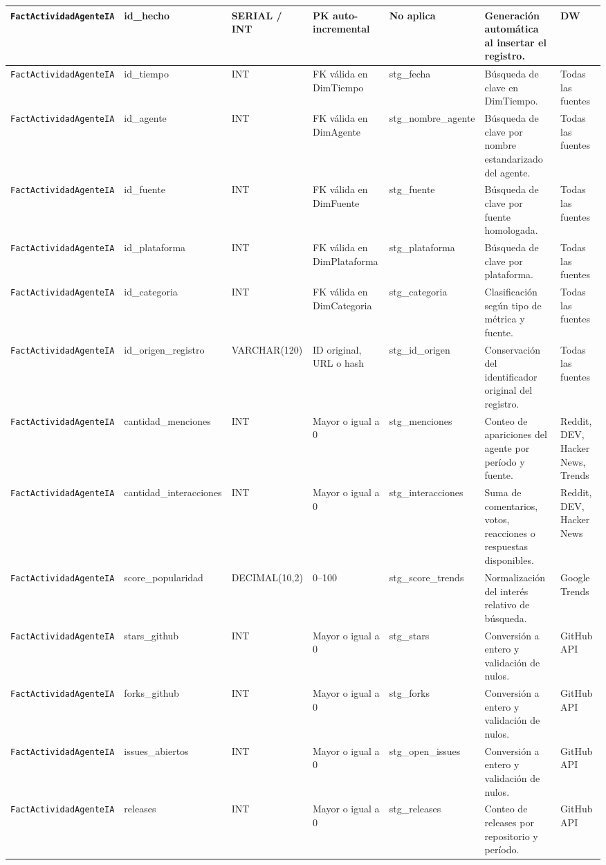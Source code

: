 \documentclass[12pt,a4paper]{article}
\newcommand{\FactTabla}{\texttt{FactActividadAgenteIA}}
\begin{document}
\begin{landscape}
\begin{longtable}{|P{3.55cm}|P{3.05cm}|P{2.35cm}|P{4.00cm}|P{3.95cm}|P{4.95cm}|P{3.05cm}|}
\FactTabla & id\_hecho & SERIAL / INT & PK auto-incremental & No aplica & Generación automática al insertar el registro. & DW \\ \hline
\FactTabla & id\_tiempo & INT & FK válida en DimTiempo & stg\_fecha & Búsqueda de clave en DimTiempo. & Todas las fuentes \\ \hline
\FactTabla & id\_agente & INT & FK válida en DimAgente & stg\_nombre\_agente & Búsqueda de clave por nombre estandarizado del agente. & Todas las fuentes \\ \hline
\FactTabla & id\_fuente & INT & FK válida en DimFuente & stg\_fuente & Búsqueda de clave por fuente homologada. & Todas las fuentes \\ \hline
\FactTabla & id\_plataforma & INT & FK válida en DimPlataforma & stg\_plataforma & Búsqueda de clave por plataforma. & Todas las fuentes \\ \hline
\FactTabla & id\_categoria & INT & FK válida en DimCategoria & stg\_categoria & Clasificación según tipo de métrica y fuente. & Todas las fuentes \\ \hline
\FactTabla & id\_origen\_registro & VARCHAR(120) & ID original, URL o hash & stg\_id\_origen & Conservación del identificador original del registro. & Todas las fuentes \\ \hline
\FactTabla & cantidad\_menciones & INT & Mayor o igual a 0 & stg\_menciones & Conteo de apariciones del agente por período y fuente. & Reddit, DEV, Hacker News, Trends \\ \hline
\FactTabla & cantidad\_interacciones & INT & Mayor o igual a 0 & stg\_interacciones & Suma de comentarios, votos, reacciones o respuestas disponibles. & Reddit, DEV, Hacker News \\ \hline
\FactTabla & score\_popularidad & DECIMAL(10,2) & 0--100 & stg\_score\_trends & Normalización del interés relativo de búsqueda. & Google Trends \\ \hline
\FactTabla & stars\_github & INT & Mayor o igual a 0 & stg\_stars & Conversión a entero y validación de nulos. & GitHub API \\ \hline
\FactTabla & forks\_github & INT & Mayor o igual a 0 & stg\_forks & Conversión a entero y validación de nulos. & GitHub API \\ \hline
\FactTabla & issues\_abiertos & INT & Mayor o igual a 0 & stg\_open\_issues & Conversión a entero y validación de nulos. & GitHub API \\ \hline
\FactTabla & releases & INT & Mayor o igual a 0 & stg\_releases & Conteo de releases por repositorio y período. & GitHub API \\ \hline

\end{longtable}
\end{landscape}
\end{document}
